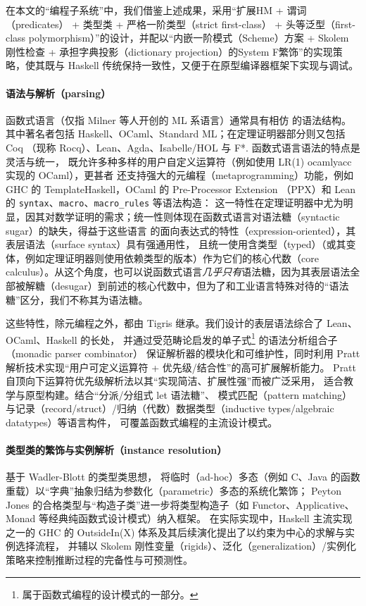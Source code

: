 \documentclass[a4paper, 11pt]{article}
\theoremstyle{remark}\newtheorem*{remark}{Remark}
\theoremstyle{definition}\newtheorem*{definition}{Definition}
\begin{document}
在本文的“编程子系统”中，我们借鉴上述成果，采用“扩展HM + 谓词（predicates） + 类型类 + 严格一阶类型（strict first-class） + 头等泛型（first-class polymorphism）”的设计，并配以“内嵌一阶模式（Scheme）方案 + Skolem 刚性检查 + 承担字典投影（dictionary projection）的System F繁饰”的实现策略，使其既与 Haskell 传统保持一致性，又便于在原型编译器框架下实现与调试。

\paragraph{语法与解析（parsing）} 函数式语言（仅指 Milner 等人开创的 ML 系语言）通常具有相仿
的语法结构。其中著名者包括 Haskell、OCaml、Standard ML；在定理证明器部分则又包括 Coq （现称 Rocq）、Lean、Agda、Isabelle/HOL 与 F*. 函数式语言语法的特点是灵活与统一，
既允许多种多样的用户自定义运算符（例如使用 LR(1) ocamlyacc 实现的 OCaml），更甚者
还支持强大的元编程（metaprogramming）功能，例如 GHC 的 TemplateHaskell，OCaml 的 Pre-Processor Extension （PPX）和 Lean 的 \texttt{syntax}、\texttt{macro}、\texttt{macro\_rules} 等语法构造：
这一特性在定理证明器中尤为明显，因其对数学证明的需求；统一性则体现在函数式语言对语法糖（syntactic sugar）的缺失，得益于这些语言
的面向表达式的特性（expression-oriented），其表层语法（surface syntax）具有强通用性，
且统一使用含类型（typed）\lambdacalc（或其变体，例如定理证明器则使用依赖类型的版本）作为它们的核心代数（core calculus）。从这个角度，也可以说函数式语言\emph{几乎只有}语法糖，因为其表层语法全部被解糖（desugar）到前述的核心代数中，但为了和工业语言特殊对待的“语法糖”区分，我们不称其为语法糖。

这些特性，除元编程之外，都由 Tigris 继承。我们设计的表层语法综合了 Lean、OCaml、Haskell 的长处，
并通过受范畴论启发的单子式\footnote{属于函数式编程的设计模式的一部分。}
的语法分析组合子（monadic parser combinator）
保证解析器的模块化和可维护性，同时利用 Pratt 解析技术实现“用户可定义运算符 + 优先级/结合性”的高可扩展解析能力。
Pratt 自顶向下运算符优先级解析法以其“实现简洁、扩展性强”而被广泛采用，
适合教学与原型构建。结合“分派/分组式 let 语法糖”、
模式匹配（pattern matching）与记录（record/struct）/归纳（代数）数据类型（inductive types/algebraic datatypes）等语言构件，
可覆盖函数式编程的主流设计模式。

\paragraph{类型类的繁饰与实例解析（instance resolution）} 基于 Wadler-Blott 的类型类思想，
将临时（ad-hoc）多态（例如 C、Java 的函数重载）以“字典”抽象归结为参数化（parametric）多态的系统化繁饰；
Peyton Jones 的合格类型与“构造子类”进一步将类型构造子（如 Functor、Applicative、Monad 等经典纯函数式设计模式）纳入框架。
在实际实现中，Haskell 主流实现之一的 GHC 的 OutsideIn(X) 体系及其后续演化提出了以约束为中心的求解与实例选择流程，
并辅以 Skolem 刚性变量（rigids）、泛化（generalization）/实例化策略来控制推断过程的完备性与可预测性。
\end{document}
